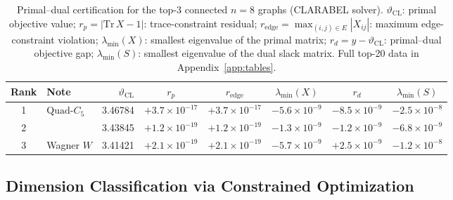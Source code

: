 \documentclass[aps,pra,twocolumn,superscriptaddress,longbibliography,floatfix]{revtex4-2}
\newcommand{\vt}{\vartheta}
\newcommand{\lmin}{\lambda_{\min}}
\newcommand{\QC}{\ensuremath{\text{Quad-}C_5}}
\begin{document}
\begin{table}[tp]
  \caption{Primal--dual certification for the top-3 connected $n=8$
           graphs (CLARABEL solver).
           $\vt_\text{CL}$: primal objective value;
           $r_p = |\mathrm{Tr}\,X-1|$: trace-constraint residual;
           $r_\text{edge} = \max_{(i,j)\in E}|X_{ij}|$: maximum
           edge-constraint violation;
           $\lmin(X)$: smallest eigenvalue of the primal matrix;
           $r_d = y - \vt_\text{CL}$: primal--dual objective gap;
           $\lmin(S)$: smallest eigenvalue of the dual slack matrix.
           Full top-20 data in Appendix~\ref{app:tables}.}
  \label{tab:top3cert}
  \begin{ruledtabular}
  \begin{tabular}{clrccccc}
    Rank & Note &
    $\vt_\text{CL}$ &
    \multicolumn{1}{c}{$r_p$} &
    \multicolumn{1}{c}{$r_\text{edge}$} &
    \multicolumn{1}{c}{$\lmin(X)$} &
    \multicolumn{1}{c}{$r_d$} &
    \multicolumn{1}{c}{$\lmin(S)$} \\
    \hline
     1 & \QC\        & 3.46784 & $+3.7\!\times\!10^{-17}$ & $+3.7\!\times\!10^{-17}$ & $-5.6\!\times\!10^{-9}$ & $-8.5\!\times\!10^{-9}$ & $-2.5\!\times\!10^{-8}$ \\
     2 &            & 3.43845 & $+1.2\!\times\!10^{-19}$ & $+1.2\!\times\!10^{-19}$ & $-1.3\!\times\!10^{-9}$ & $-1.2\!\times\!10^{-9}$ & $-6.8\!\times\!10^{-9}$ \\
     3 & Wagner $W$ & 3.41421 & $+2.1\!\times\!10^{-19}$ & $+2.1\!\times\!10^{-19}$ & $-5.7\!\times\!10^{-9}$ & $+2.5\!\times\!10^{-9}$ & $-1.2\!\times\!10^{-8}$ \\
  \end{tabular}
  \end{ruledtabular}
\end{table}

\subsection{Dimension Classification via Constrained Optimization}
\label{sec:method_dim}
\end{document}
